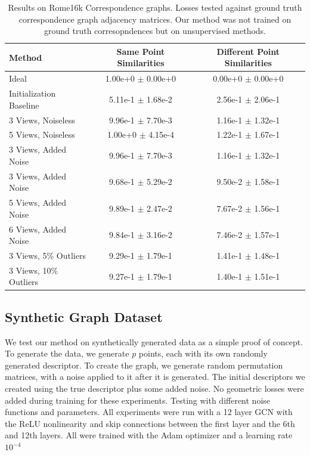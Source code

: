 \documentclass[10pt,twocolumn,letterpaper]{article}
\begin{document}
\begin{table}
\begin{center}
\begin{tabular}{|l|c|c|}
\hline
Method & Same Point Similarities & Different Point Similarities  \\
\hline\hline\hline
Ideal                              & 1.00e+0 $\pm$ 0.00e+0 & 0.00e+0 $\pm$ 0.00e+0 \\ \hline
Initialization Baseline            & 5.11e-1 $\pm$ 1.68e-2 & 2.56e-1 $\pm$ 2.06e-1 \\ \hline
3 Views, Noiseless                 & 9.96e-1 $\pm$ 7.70e-3 & 1.16e-1 $\pm$ 1.32e-1 \\ \hline
5 Views, Noiseless                 & 1.00e+0 $\pm$ 4.15e-4 & 1.22e-1 $\pm$ 1.67e-1 \\ \hline
3 Views, Added Noise               & 9.96e-1 $\pm$ 7.70e-3 & 1.16e-1 $\pm$ 1.32e-1 \\ \hline
3 Views, Added Noise               & 9.68e-1 $\pm$ 5.29e-2 & 9.50e-2 $\pm$ 1.58e-1 \\ \hline
5 Views, Added Noise               & 9.89e-1 $\pm$ 2.47e-2 & 7.67e-2 $\pm$ 1.56e-1 \\ \hline
6 Views, Added Noise               & 9.84e-1 $\pm$ 3.16e-2 & 7.46e-2 $\pm$ 1.57e-1 \\ \hline
3 Views, 5\% Outliers              & 9.29e-1 $\pm$ 1.79e-1 & 1.41e-1 $\pm$ 1.48e-1 \\ \hline
3 Views, 10\% Outliers             & 9.27e-1 $\pm$ 1.79e-1 & 1.40e-1 $\pm$ 1.51e-1 \\ \hline

\hline
\end{tabular}
\end{center}
\caption{
Results on Rome16k Correspondence graphs.
Losses tested against ground truth correspondence graph adjacency matrices.
Our method was not trained on ground truth corresopndences but on unsupervised methods.
}
\end{table}
\subsection{Synthetic Graph Dataset}
We test our method on synthetically generated data as a simple proof of concept.
To generate the data, we generate $p$ points, each with its own randomly generated descriptor.
To create the graph, we generate random permutation matrices, with a noise applied to it after it is generated.
The initial descriptors we created using the true descriptor plus some added noise.
No geometric losses were added during training for these experiments.
Testing with different noise functions and parameters.
All experiments were run with a 12 layer GCN with the ReLU nonlinearity and skip connections between the first layer and the 6th and 12th layers.
All were trained with the Adam optimizer and a learning rate $10^{-4}$
\end{document}
